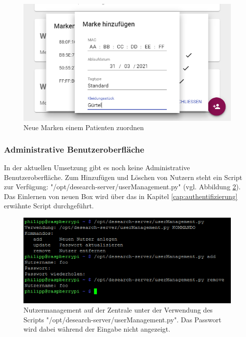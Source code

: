 \begin{figure}
	\centering
	\includegraphics[width=1.0\linewidth]{images/ui/markehinzufuegen}
	\caption{Neue Marken einem Patienten zuordnen}
	\label{img:ui/markehinzufuegen}
\end{figure}

\subsubsection{Administrative Benutzeroberfläche}
In der aktuellen Umsetzung gibt es noch keine Administrative Benutzeroberfläche. Zum Hinzufügen und Löschen von Nutzern steht ein Script zur Verfügung: "/opt/desearch-server/userManagement.py" (vgl. Abbildung \ref{img:userManagement}).\newline
Das Einlernen von neuen Box wird über das in Kapitel \ref{cap:authentifizierung} erwähnte Script durchgeführt.

\begin{figure}
	\centering
	\includegraphics[width=1.0\linewidth]{images/userManagement}
	\caption[Nutzermanagement auf der Zentrale]{Nutzermanagement auf der Zentrale unter der Verwendung des Scripts "/opt/desearch-server/userManagement.py". Das Passwort wird dabei während der Eingabe nicht angezeigt.}
	\label{img:userManagement}
\end{figure}


